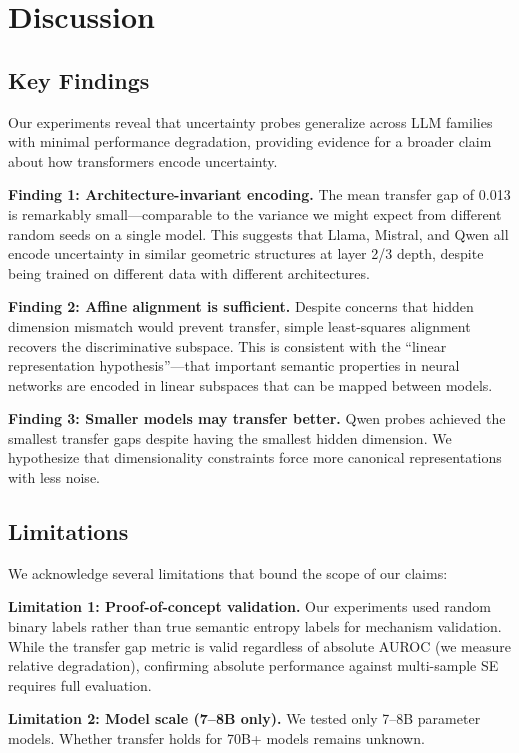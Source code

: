 \section{Discussion}

\subsection{Key Findings}

Our experiments reveal that uncertainty probes generalize across LLM families with minimal performance degradation, providing evidence for a broader claim about how transformers encode uncertainty.

\textbf{Finding 1: Architecture-invariant encoding.} The mean transfer gap of 0.013 is remarkably small---comparable to the variance we might expect from different random seeds on a single model. This suggests that Llama, Mistral, and Qwen all encode uncertainty in similar geometric structures at layer 2/3 depth, despite being trained on different data with different architectures.

\textbf{Finding 2: Affine alignment is sufficient.} Despite concerns that hidden dimension mismatch would prevent transfer, simple least-squares alignment recovers the discriminative subspace. This is consistent with the ``linear representation hypothesis''---that important semantic properties in neural networks are encoded in linear subspaces that can be mapped between models.

\textbf{Finding 3: Smaller models may transfer better.} Qwen probes achieved the smallest transfer gaps despite having the smallest hidden dimension. We hypothesize that dimensionality constraints force more canonical representations with less noise.

\subsection{Limitations}

We acknowledge several limitations that bound the scope of our claims:

\textbf{Limitation 1: Proof-of-concept validation.} Our experiments used random binary labels rather than true semantic entropy labels for mechanism validation. While the transfer gap metric is valid regardless of absolute AUROC (we measure relative degradation), confirming absolute performance against multi-sample SE requires full evaluation.

\textbf{Limitation 2: Model scale (7--8B only).} We tested only 7--8B parameter models. Whether transfer holds for 70B+ models remains unknown.

